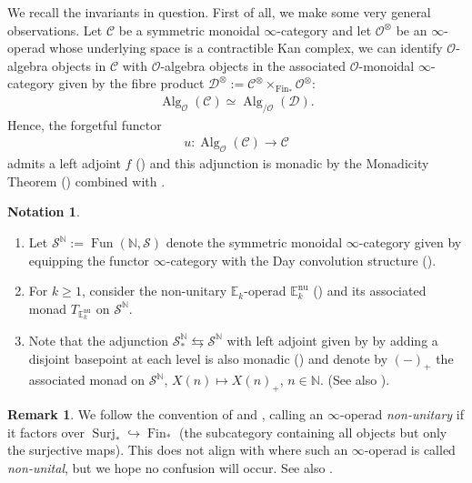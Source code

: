 \documentclass[12pt, reqno]{amsart}
\theoremstyle{plain}
\theoremstyle{definition}
\newtheorem{remark}[theorem]{Remark}
\newtheorem{notation}[theorem]{Notation}
\newcommand{\N}{\mathbb N}
\begin{document}
We recall the invariants in question. First of all, we make some very general observations. Let $\mathcal{C}$ be a symmetric monoidal $\infty$-category and let $\mathcal{O}^\otimes$ be an $\infty$-operad whose underlying space is a contractible Kan complex, we can identify $\mathcal{O}$-algebra objects in $\mathcal{C}$ with $\mathcal{O}$-algebra objects in the associated $\mathcal{O}$-monoidal $\infty$-category given by the fibre product $\mathcal{D}^\otimes:=\mathcal{C}^\otimes \times_{\operatorname{Fin}_\ast}\mathcal{O}^\otimes$:
\begin{align*}
\operatorname{Alg}_{\mathcal{O}}(\mathcal{C})\simeq \operatorname{Alg}_{/\mathcal{O}}(\mathcal{D}).
\end{align*}
Hence, the forgetful functor
\begin{align*}
u\colon \operatorname{Alg}_{\mathcal{O}}(\mathcal{C})\rightarrow \mathcal{C}
\end{align*}
admits a left adjoint $f$ (\cite[Example 3.1.3.6]{LurieHA}) and this adjunction is monadic by the Monadicity Theorem (\cite[Theorem 4.7.3.5]{LurieHA}) combined with \cite[Lemma 3.2.2.6 and Proposition 3.2.3.1]{LurieHA}.

\begin{notation}\ 
\begin{enumerate}
\item Let $\mathcal{S}^\N:=\operatorname{Fun}(\N,\mathcal{S})$ denote the symmetric monoidal $\infty$-category given by equipping the functor $\infty$-category with the Day convolution structure (\cite[Example 2.2.6.17]{LurieHA}).
\item For $k\geq 1$, consider the non-unitary $\mathbb{E}_k$-operad $\mathbb{E}_k^{\operatorname{nu}}$ (\cite[Definition 5.4.4.1]{LurieHA}) and its associated monad $T_{\mathbb{E}_k^{\operatorname{nu}}}$ on $\mathcal{S}^\N$.
\item Note that the adjunction $\mathcal{S}^\N_*\leftrightarrows \mathcal{S}^\N$ with left adjoint given by by adding a disjoint basepoint at each level is also monadic (\cite[Theorem 4.7.3.5]{LurieHA}) and denote by $(-)_+$ the associated monad on $\mathcal{S}^\N$, $X(n)\mapsto X(n)_+$, $n\in \N$. (See also \cite[p.825]{LurieHA}).\qedhere
\end{enumerate}
\end{notation}

\begin{remark}
We follow the convention of \cite{GalatiusKupersRandalWilliams} and \cite{HorelKrannichKupers}, calling an $\infty$-operad \textit{non-unitary} if it factors over $\operatorname{Surj}_*\hookrightarrow \operatorname{Fin}_*$ (the subcategory containing all objects but only the surjective maps). This does not align with \cite{LurieHA} where such an $\infty$-operad is called \textit{non-unital}, but we hope no confusion will occur. See also \cite[Remark 1.2]{HorelKrannichKupers}.
\end{remark}
\end{document}
